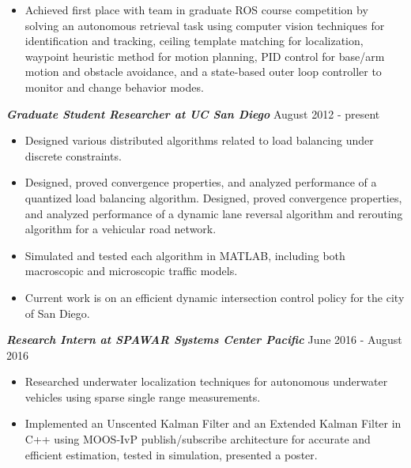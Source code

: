 \documentclass{res}
\begin{document}
\begin{resume}
\begin{itemize}
\item Achieved first place with team in graduate ROS course competition by solving an autonomous retrieval task using computer vision techniques for identification and tracking, ceiling template matching for localization, waypoint heuristic method for motion planning, PID control for base/arm motion and obstacle avoidance, and a state-based outer loop controller to monitor and change behavior modes.
\end{itemize}
\vspace*{-1ex}
{\sl  \bf Graduate Student Researcher at UC San Diego} \hfill August 2012 - present
\vspace*{.5ex}
\begin{itemize}
\item Designed various distributed algorithms related to load balancing under discrete constraints.
\vspace*{-.5ex}
\item Designed, proved convergence properties, and analyzed performance of a quantized load balancing algorithm. Designed, proved convergence properties, and analyzed performance of a dynamic lane reversal algorithm and rerouting algorithm for a vehicular road network. 
\vspace*{-.5ex}
\item Simulated and tested each algorithm in MATLAB, including both macroscopic and microscopic traffic models.
\vspace*{-.5ex}
\item Current work is on an efficient dynamic intersection control policy for the city of San Diego.
\end{itemize}
{\sl \bf Research Intern at SPAWAR Systems Center Pacific } \hfill June 2016 - August 2016 
\begin{itemize}
\item Researched underwater localization techniques for autonomous underwater vehicles using sparse single range measurements. 
\vspace*{-.5ex}
\item Implemented an Unscented Kalman Filter and an Extended Kalman Filter in C++ using MOOS-IvP publish/subscribe architecture for accurate and efficient estimation, tested in simulation, presented a poster.
\vspace*{-.5ex}
\end{itemize}

\end{resume}
\end{document}
